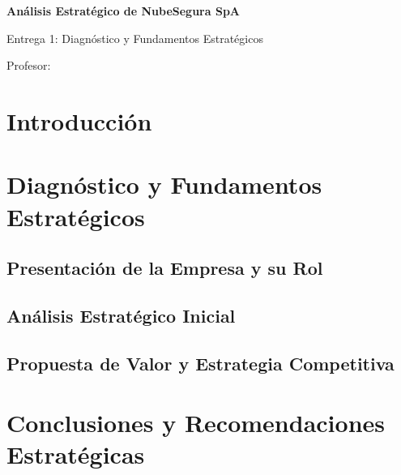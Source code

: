\documentclass[12pt,a4paper]{article}
\begin{document}
\begin{titlepage}
\centering
{\Large \NombreRamo\par}
\vspace{2cm}
{\LARGE\bfseries Análisis Estratégico de NubeSegura SpA\par}
\vspace{0.8cm}
{\large Entrega 1: Diagnóstico y Fundamentos Estratégicos\par}
\vfill
{\large \NumeroGrupo\par}
\vspace{0.5cm}
\Integrantes
\vspace{1cm}
Profesor: \NombreProfesor\par
\vfill
\FechaEntrega
\end{titlepage}
\tableofcontents
\newpage
\section*{Introducción}

\section{Diagnóstico y Fundamentos Estratégicos}
\subsection{Presentación de la Empresa y su Rol}

\subsection{Análisis Estratégico Inicial}




\subsection{Propuesta de Valor y Estrategia Competitiva}

\section*{Conclusiones y Recomendaciones Estratégicas}

\clearpage
\printbibliography[heading=bibintoc,title={Bibliografía}]
\end{document}
